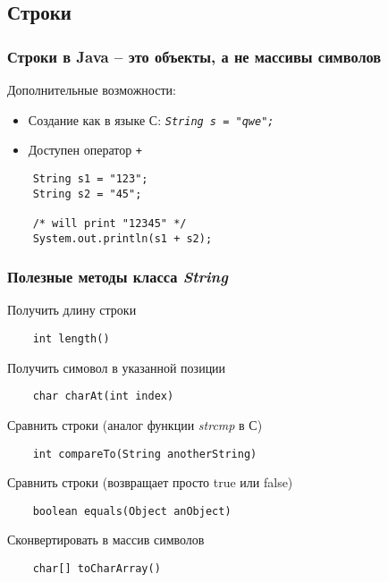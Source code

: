 \subsection{Строки}
\begin{frame}[fragile]
	\begin{Large}
	\frametitle{Строки в Java -- это объекты, а не массивы символов}

	Дополнительные возможности:
	\begin{itemize}
	\item{Создание как в языке С: \emph{\texttt{String s = "qwe";}}}
	\item{Доступен оператор \texttt{+}}
	\end{itemize}
	\medskip
	\begin{verbatim}
	String s1 = "123";
	String s2 = "45";

	/* will print "12345" */
	System.out.println(s1 + s2);
	\end{verbatim}
	\end{Large}
\end{frame}

\begin{frame}[fragile]
	\frametitle{Полезные методы класса \textit{String}}

	\begin{large}
	Получить длину строки
	\begin{verbatim}
	int length()
	\end{verbatim}

	Получить симовол в указанной позиции
	\begin{verbatim}
	char charAt(int index)
	\end{verbatim}

	Сравнить строки (аналог функции \emph{strcmp} в С)
	\begin{verbatim}
	int compareTo(String anotherString) 
	\end{verbatim}

	Сравнить строки (возвращает просто true или false)
	\begin{verbatim}
	boolean equals(Object anObject)
	\end{verbatim}

	Сконвертировать в массив символов
	\begin{verbatim}
	char[] toCharArray()
	\end{verbatim}
	\end{large}
\end{frame}

